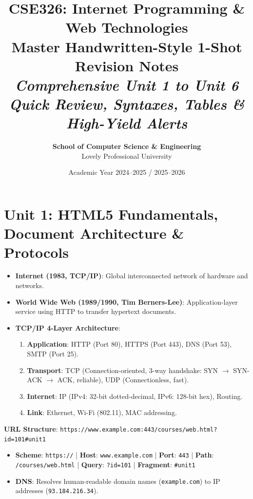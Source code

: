 \documentclass[a4paper,11pt]{article}
\title{\textbf{\LARGE CSE326: Internet Programming \& Web Technologies}\\[3mm]
\Large\textbf{Master Handwritten-Style 1-Shot Revision Notes}\\[2mm]
\large\textit{Comprehensive Unit 1 to Unit 6 Quick Review, Syntaxes, Tables \& High-Yield Alerts}}
\author{\textbf{School of Computer Science \& Engineering} \\ Lovely Professional University}
\date{Academic Year 2024--2025 / 2025--2026}
\begin{document}
\maketitle
\tableofcontents
\newpage

\section{Unit 1: HTML5 Fundamentals, Document Architecture \& Protocols}

\begin{conceptbox}
\begin{itemize}[leftmargin=*]
    \item \textbf{Internet (1983, TCP/IP)}: Global interconnected network of hardware and networks.
    \item \textbf{World Wide Web (1989/1990, Tim Berners-Lee)}: Application-layer service using HTTP to transfer hypertext documents.
    \item \textbf{TCP/IP 4-Layer Architecture}:
    \begin{enumerate}
        \item \textbf{Application}: HTTP (Port 80), HTTPS (Port 443), DNS (Port 53), SMTP (Port 25).
        \item \textbf{Transport}: TCP (Connection-oriented, 3-way handshake: SYN $\to$ SYN-ACK $\to$ ACK, reliable), UDP (Connectionless, fast).
        \item \textbf{Internet}: IP (IPv4: 32-bit dotted-decimal, IPv6: 128-bit hex), Routing.
        \item \textbf{Link}: Ethernet, Wi-Fi (802.11), MAC addressing.
    \end{enumerate}
\end{itemize}
\end{conceptbox}

\begin{handwbox}
\textbf{URL Structure}: \texttt{https://www.example.com:443/courses/web.html?id=101\#unit1}
\begin{itemize}[leftmargin=*]
    \item \textbf{Scheme}: \texttt{https://} | \textbf{Host}: \texttt{www.example.com} | \textbf{Port}: \texttt{443} | \textbf{Path}: \texttt{/courses/web.html} | \textbf{Query}: \texttt{?id=101} | \textbf{Fragment}: \texttt{\#unit1}
    \item \textbf{DNS}: Resolves human-readable domain names (\texttt{example.com}) to IP addresses (\texttt{93.184.216.34}).
\end{itemize}
\end{handwbox}
\end{document}
